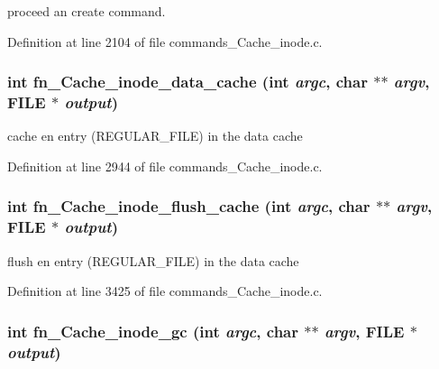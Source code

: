 proceed an create command. 

Definition at line 2104 of file commands\_\-Cache\_\-inode.c.
\subsubsection[{fn\_\-Cache\_\-inode\_\-data\_\-cache}]{\setlength{\rightskip}{0pt plus 5cm}int fn\_\-Cache\_\-inode\_\-data\_\-cache (int {\em argc}, \/  char $\ast$$\ast$ {\em argv}, \/  FILE $\ast$ {\em output})}\label{commands__Cache__inode_8c_0bdb2b1764b0dfb7ea511b24bb27549c}


cache en entry (REGULAR\_\-FILE) in the data cache 

Definition at line 2944 of file commands\_\-Cache\_\-inode.c.
\subsubsection[{fn\_\-Cache\_\-inode\_\-flush\_\-cache}]{\setlength{\rightskip}{0pt plus 5cm}int fn\_\-Cache\_\-inode\_\-flush\_\-cache (int {\em argc}, \/  char $\ast$$\ast$ {\em argv}, \/  FILE $\ast$ {\em output})}\label{commands__Cache__inode_8c_096579b40ab0979f63b478dca8872192}


flush en entry (REGULAR\_\-FILE) in the data cache 

Definition at line 3425 of file commands\_\-Cache\_\-inode.c.
\subsubsection[{fn\_\-Cache\_\-inode\_\-gc}]{\setlength{\rightskip}{0pt plus 5cm}int fn\_\-Cache\_\-inode\_\-gc (int {\em argc}, \/  char $\ast$$\ast$ {\em argv}, \/  FILE $\ast$ {\em output})}\label{commands__Cache__inode_8c_f9e30aa72007966403bac9988d4eed5b}


